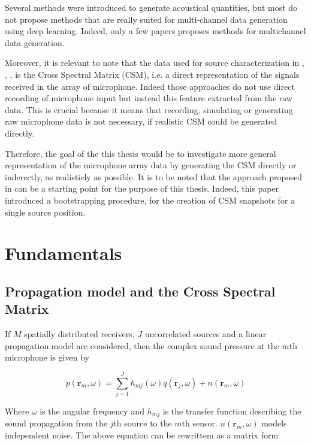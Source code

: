 \documentclass[11pt,a4paper,twoside]{report}
\begin{document}
Several methods were introduced to generate acoustical quantities, but most do not propose methods that are really suited for multi-channel data generation using deep learning. Indeed, only a few papers proposes methods for multichannel data generation. 

Moreover, it is relevant to note that the data used for source characterization in \cite{castellini2021neural}, \cite{lee2021deep}, \cite{ma2019phased}, \cite{xu2021deep} is the Cross Spectral Matrix (CSM), i.e. a direct representation of the signals received in the array of microphone. Indeed those approaches do not use direct recording of microphone input but instead this feature extracted from the raw data. This is crucial because it means that recording, simulating or generating raw microphone data is not necessary, if realistic CSM could be generated directly. 

Therefore, the goal of the this thesis would be to investigate more general representation of the microphone array data by generating the CSM directly or inderectly, as realisticly as possible. It is to be noted that the approach proposed in \cite{gerstoft2020parametric} can be a starting point for the purpose of this thesis. Indeed, this paper introduced a bootstrapping procedure, for the creation of CSM snapshots for a single source position.

\chapter{Fundamentals}

\section{Propagation model and the Cross Spectral Matrix}

If $M$ spatially distributed receivers, $J$ uncorrelated sources and a linear propagation model are considered, then the complex sound pressure at the $m$th microphone is given by

\begin{equation}
    p(\mathbf{r}_m, \omega) = \sum_{j = 1}^{J} h_{mj}(\omega)q(\mathbf{r}_j, \omega) + n(\mathbf{r}_m, \omega)
\end{equation}

Where $\omega$ is the angular frequency and $h_{mj}$ is the transfer function  describing the sound propagation from the $j$th source to the $m$th sensor. $n(\mathbf{r}_m, \omega)$ models independent noise. The above equation can be rewrittem as a matrix form
\end{document}
